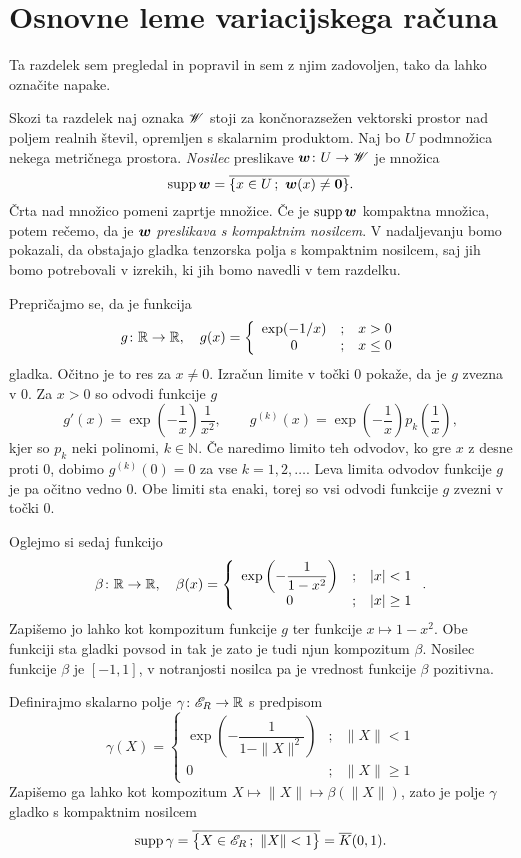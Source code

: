 \section{Osnovne leme variacijskega računa}


\textcolor[rgb]{0,0.58,0}{Ta razdelek sem pregledal in popravil in sem z njim zadovoljen, tako da lahko označite napake.}

Skozi ta razdelek naj oznaka $\mathscr W$ stoji za
končnorazsežen vektorski prostor nad poljem realnih števil, opremljen s skalarnim produktom.
Naj bo $U$ podmnožica nekega metričnega prostora.
\emph{Nosilec} preslikave $\boldsymbol w\colon U\to\mathscr W$ je množica
\[ \mathrm{supp}\,\vek{w}=\overline{\{ x\in U\,;\ \vek{w}(x)\neq\vek{0} \}}. \]
Črta nad množico pomeni zaprtje množice. Če je $\mathrm{supp}\,\boldsymbol w$ kompaktna množi\-ca, potem rečemo,
da je $\boldsymbol w$ \emph{preslikava s kompaktnim nosilcem}. V nadaljevanju bomo pokazali, da obstajajo gladka
tenzorska polja s kompaktnim nosilcem, saj jih bomo potrebovali v izrekih, ki jih bomo navedli v tem razdelku.

Prepričajmo se, da je funkcija
\[
	g\colon\mathbb R\to\mathbb R,\quad g(x)=\left\{\begin{array}{ccl}
	\exp(-1/x)&;&x>0 \\ 0&;&x\leq 0 \end{array}\right.
\]
gladka. Očitno je to res za $x\neq 0$. Izračun limite v točki $0$ pokaže, da
je $g$ zvezna v 0. Za $x>0$ so odvodi funkcije $g$
\[
	g'(x)=\exp\left(-\frac{1}{x}\right)\frac{1}{x^2},\qquad
	g^{(k)}(x)=\exp\left(-\frac{1}{x}\right)p_k\left(\frac{1}{x}\right),
\]
kjer so $p_k$ neki polinomi, $k\in\mathbb{N}$. Če naredimo limito teh odvodov, ko
gre $x$ z desne proti 0, dobimo $g^{(k)}(0)=0$ za vse $k=1,2,\dots$. Leva limita
odvodov funkcije $g$ je pa očitno vedno 0. Obe limiti sta enaki, torej so vsi odvodi
funkcije $g$ zvezni v točki 0.

Oglejmo si sedaj funkcijo
\[
	\beta\colon\mathbb R\to\mathbb R,\quad \beta(x)=\left\{\begin{array}{ccl}
	\exp\left(-\dfrac{1}{1-x^2}\right)&;&|x|<1 \\ 0&;&|x|\geq 1 \end{array}\right. .
\]
Zapišemo jo lahko kot kompozitum funkcije $g$ ter funkcije $x\mapsto 1-x^2$. Obe funkciji sta
gladki povsod in tak je zato je tudi njun kompozitum $\beta$. Nosilec funkcije $\beta$ je
$[-1,1]$, v notranjosti nosilca pa je vrednost funkcije $\beta$ pozitivna.

Definirajmo skalarno polje $\gamma\colon\mathscr E_R\to\mathbb R$ s predpisom
\[
	\gamma(X)=\left\{\begin{array}{ccl}
	\exp\left(-\dfrac{1}{1-\|X\|^2}\right)&;&\|X\|<1 \\ 0&;&\|X\|\geq 1 \end{array}\right.
\]
Zapišemo ga lahko kot kompozitum $X\mapsto\|X\|\mapsto \beta(\|X\|)$, zato je polje
$\gamma$ gladko s kompaktnim nosilcem
\[ \textrm{supp}\,\gamma=\overline{\big\{X\in\E_R\,;\ \|X\|<1 \big\}}=\overline{K}(0,1). \]

